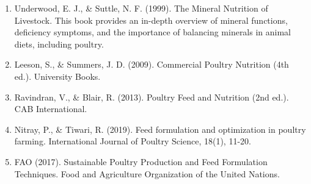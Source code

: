 \documentclass[a4paper,12pt]{article}
\begin{document}
\begin{enumerate}
	\item Underwood, E. J., \& Suttle, N. F. (1999). The Mineral Nutrition of Livestock. This book
provides an in-depth overview of mineral functions, deficiency symptoms, and the
importance of balancing minerals in animal diets, including poultry.

	\item Leeson, S., \& Summers, J. D. (2009). Commercial Poultry Nutrition (4th ed.).
University Books.

	\item Ravindran, V., \& Blair, R. (2013). Poultry Feed and Nutrition (2nd ed.). CAB
International.

	\item Nitray, P., \& Tiwari, R. (2019). Feed formulation and optimization in poultry
farming. International Journal of Poultry Science, 18(1), 11-20.

	\item FAO (2017). Sustainable Poultry Production and Feed Formulation Techniques.
Food and Agriculture Organization of the United Nations.

	
\end{enumerate}
\end{document}
